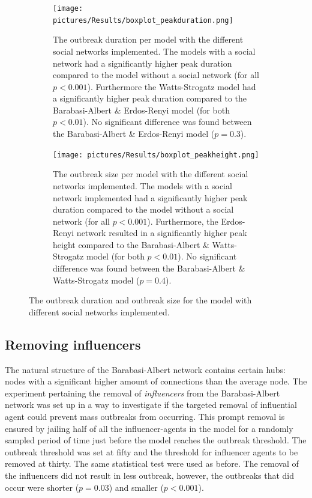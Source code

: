 \documentclass[10pt]{article}
\begin{document}
    \begin{figure}[h!]
        \centering
        \begin{subfigure}[b]{.45\linewidth}
            \texttt{[image: pictures/Results/boxplot\_peakduration.png]}
            \caption{The outbreak duration per model with the different social networks implemented. The models with a social network had a significantly higher peak duration compared to the model without a social network (for all $p < 0.001$).
            Furthermore the Watts-Strogatz model had a significantly higher peak duration compared to the Barabasi-Albert \& Erdos-Renyi model (for both $p < 0.01$). No significant difference was found between the Barabasi-Albert \& Erdos-Renyi model ($p = 0.3$). }
            \label{fig:duration}
        \end{subfigure}\hspace{5mm}
        \begin{subfigure}[b]{.45\linewidth}
            \texttt{[image: pictures/Results/boxplot\_peakheight.png]}
            \caption{The outbreak size per model with the different social networks implemented. The models with a social network implemented had a significantly higher peak duration compared to the model without a social network (for all $p < 0.001$). Furthermore, the Erdos-Renyi network resulted in a significantly higher peak height compared to the Barabasi-Albert \& Watts-Strogatz model (for both $p < 0.01$). No significant difference was found between the Barabasi-Albert \& Watts-Strogatz model ($p = 0.4$). }
            \label{fig:size}
        \end{subfigure}
        \captionsetup{width=0.95\linewidth}
        \caption{The outbreak duration and outbreak size for the model with different social networks implemented.}
        \label{fig:results}
    \end{figure}

    \subsection{Removing influencers}
    The natural structure of the Barabasi-Albert network contains certain hubs: nodes with a significant higher amount of connections than the average node. The experiment pertaining the removal of \textit{influencers} from the Barabasi-Albert network was set up in a way to investigate if the targeted removal of influential agent could prevent mass outbreaks from occurring. This prompt removal is ensured by jailing half of all the influencer-agents in the model for a randomly sampled period of time just before the model reaches the outbreak threshold. The outbreak threshold was set at fifty and the threshold for influencer agents to be removed at thirty. The same statistical test were used as before. The removal of the influencers did not result in less outbreak, however, the outbreaks that did occur were shorter ($p = 0.03$) and smaller ($p < 0.001$).
\end{document}
